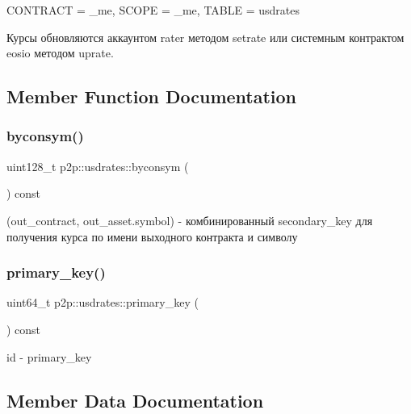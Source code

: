 C\+O\+N\+T\+R\+A\+CT = \+\_\+me, S\+C\+O\+PE = \+\_\+me, T\+A\+B\+LE = usdrates

Курсы обновляются аккаунтом rater методом setrate или системным контрактом eosio методом uprate. 

\subsection{Member Function Documentation}
\mbox{\label{structp2p_1_1usdrates_a6d13bdd9e62d26ca68146e642e330099}} 
\subsubsection{\texorpdfstring{byconsym()}{byconsym()}}
{\footnotesize\ttfamily uint128\+\_\+t p2p\+::usdrates\+::byconsym (\begin{DoxyParamCaption}{ }\end{DoxyParamCaption}) const\hspace{0.3cm}{\ttfamily [inline]}}

(out\+\_\+contract, out\+\_\+asset.\+symbol) -\/ комбинированный secondary\+\_\+key для получения курса по имени выходного контракта и символу \mbox{\label{structp2p_1_1usdrates_a8bdf953b105c26b52b6fe3be2b910925}} 
\subsubsection{\texorpdfstring{primary\+\_\+key()}{primary\_key()}}
{\footnotesize\ttfamily uint64\+\_\+t p2p\+::usdrates\+::primary\+\_\+key (\begin{DoxyParamCaption}{ }\end{DoxyParamCaption}) const\hspace{0.3cm}{\ttfamily [inline]}}

id -\/ primary\+\_\+key 

\subsection{Member Data Documentation}
\mbox{\label{structp2p_1_1usdrates_a5f755d95b0efa7942636fddfae33db2f}} 
